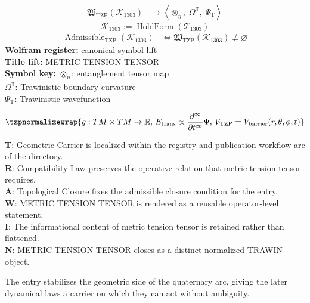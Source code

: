 \noindent
\begin{minipage}[t]{0.48\linewidth}
\begingroup
\small
\[
\begin{aligned}
\mathfrak{W}_{\mathrm{TZP}}\!\left(\mathcal{K}_{1303}\right)
&\longmapsto
\left\langle \otimes_{\eta},\; \Omega^{\mathbb{T}},\; \Psi_{\mathrm{T}} \right\rangle
\end{aligned}
\]
\[
\mathcal{K}_{1303}
:=
\operatorname{HoldForm}\!\left(\mathcal{T}_{1303}\right)
\]
\[
\begin{aligned}
\operatorname{Admissible}_{\mathrm{TZP}}\!\left(\mathcal{K}_{1303}\right)
&\Longleftrightarrow
\mathfrak{W}_{\mathrm{TZP}}\!\left(\mathcal{K}_{1303}\right)\not\equiv\varnothing
\end{aligned}
\]
\textbf{Wolfram register:} canonical symbol lift\\
\textbf{Title lift:} METRIC TENSION TENSOR\\
\textbf{Symbol key:} \(\otimes_{\eta}\): entanglement tensor map\\ \(\Omega^{\mathbb{T}}\): Trawinistic boundary curvature\\ \(\Psi_{\mathrm{T}}\): Trawinistic wavefunction
\par
\endgroup
\end{minipage}\hfill
\begin{minipage}[t]{0.48\linewidth}
\[
\tzpnormalizewrap{g:TM\times TM\to\mathbb{R},\,E_{\mathrm{trans}}\propto\frac{\partial^\infty}{\partial t^\infty}\Psi,\,V_{\mathrm{TZP}}=V_{\mathrm{barrier}}(r,\theta,\phi,t)}
\]

\small
\textbf{T}: Geometric Carrier is localized within the registry and publication workflow arc of the directory.\\
\textbf{R}: Compatibility Law preserves the operative relation that metric tension tensor requires.\\
\textbf{A}: Topological Closure fixes the admissible closure condition for the entry.\\
\textbf{W}: METRIC TENSION TENSOR is rendered as a reusable operator-level statement.\\
\textbf{I}: The informational content of metric tension tensor is retained rather than flattened.\\
\textbf{N}: METRIC TENSION TENSOR closes as a distinct normalized TRAWIN object.
\normalsize
\end{minipage}

The entry stabilizes the geometric side of the quaternary arc, giving the later dynamical laws a carrier on which they can act without ambiguity.
\clearpage


